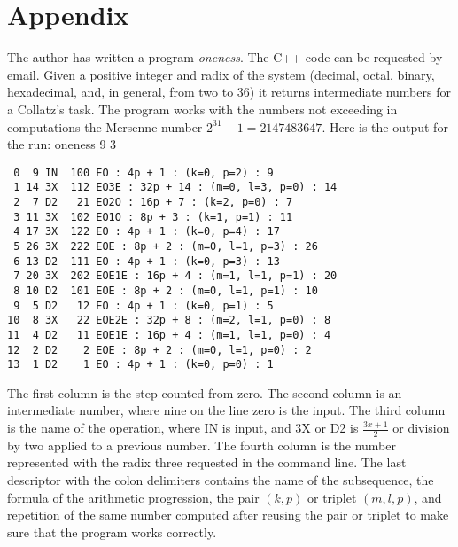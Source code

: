\documentclass{article}
\begin{document}
\section{Appendix}
The author has written a program \textit{oneness}. The C++ code can be requested by email. Given a positive integer and radix of the system (decimal, octal, binary, hexadecimal, and, in general, from two to 36) it returns intermediate numbers for a Collatz's task. The program works with the numbers not exceeding in computations the Mersenne number $2^{31} - 1 = 2147483647$. Here is the output for the run: oneness 9 3
\begin{verbatim}
 0  9 IN  100 EO : 4p + 1 : (k=0, p=2) : 9
 1 14 3X  112 EO3E : 32p + 14 : (m=0, l=3, p=0) : 14
 2  7 D2   21 EO2O : 16p + 7 : (k=2, p=0) : 7
 3 11 3X  102 EO1O : 8p + 3 : (k=1, p=1) : 11
 4 17 3X  122 EO : 4p + 1 : (k=0, p=4) : 17
 5 26 3X  222 EOE : 8p + 2 : (m=0, l=1, p=3) : 26
 6 13 D2  111 EO : 4p + 1 : (k=0, p=3) : 13
 7 20 3X  202 EOE1E : 16p + 4 : (m=1, l=1, p=1) : 20
 8 10 D2  101 EOE : 8p + 2 : (m=0, l=1, p=1) : 10
 9  5 D2   12 EO : 4p + 1 : (k=0, p=1) : 5
10  8 3X   22 EOE2E : 32p + 8 : (m=2, l=1, p=0) : 8
11  4 D2   11 EOE1E : 16p + 4 : (m=1, l=1, p=0) : 4
12  2 D2    2 EOE : 8p + 2 : (m=0, l=1, p=0) : 2
13  1 D2    1 EO : 4p + 1 : (k=0, p=0) : 1
\end{verbatim}
The first column is the step counted from zero. The second column is an intermediate number, where nine on the line zero is the input. The third column is the name of the operation, where IN is input, and 3X or D2 is $\frac{3x+1}{2}$ or division by two applied to a previous number. The fourth column is the number represented with the radix three requested in the command line. The last descriptor with the colon delimiters contains the name of the subsequence, the formula of the arithmetic progression, the pair $(k, p)$ or triplet $(m, l, p)$, and repetition of the same number computed after reusing the pair or triplet to make sure that the program works correctly.
\end{document}
